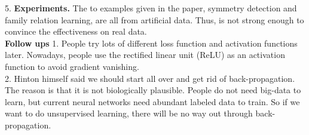 \documentclass{article}
\begin{document}
5. \textbf{Experiments.} The to examples given in the paper, symmetry detection and family relation learning, are all from artificial data. Thus, is not strong enough to convince the effectiveness on real data.\\
\textbf{Follow ups}
1. People try lots of different loss function and activation functions later. Nowadays, people use the rectified linear unit (ReLU) as an activation function to avoid gradient vanishing.\\
2. Hinton himself said we should start all over and get rid of back-propagation. The reason is that it is not biologically plausible. People do not need big-data to learn, but current neural networks need abundant labeled data to train. So if we want to do unsupervised learning, there will be no way out through back-propagation.

\newpage



\end{document}
